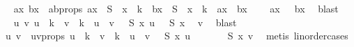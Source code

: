 \begin{isabellebody}
\ \isamarkupfalse%
\ ax\ bx\ \ ab{\isacharunderscore}{\kern0pt}props{\isacharcolon}{\kern0pt}\ {\isachardoublequoteopen}ax\ {\isasymin}\ S\ {\isacharbackquote}{\kern0pt}\ x\ {\isacharbackquote}{\kern0pt}\ {\isacharbraceleft}{\kern0pt}{\isachardot}{\kern0pt}{\isachardot}{\kern0pt}k{\isacharbraceright}{\kern0pt}\ {\isasymand}\ bx\ {\isasymin}\ S\ {\isacharbackquote}{\kern0pt}\ x\ {\isacharbackquote}{\kern0pt}\ {\isacharbraceleft}{\kern0pt}{\isachardot}{\kern0pt}{\isachardot}{\kern0pt}k{\isacharbraceright}{\kern0pt}\ {\isasymand}\ ax\ {\isasymnoteq}\ bx\ {\isasymand}\isanewline
\ \ {\isasymchi}\ ax\ {\isacharequal}{\kern0pt}\ {\isasymchi}\ bx{\isachardoublequoteclose}\ \isamarkupfalse%
\ blast\isanewline
\ \ \isamarkupfalse%
\ \isamarkupfalse%
\ {\isachardoublequoteopen}{\isasymexists}u\ v{\isachardot}{\kern0pt}\ u\ {\isasymin}\ {\isacharbraceleft}{\kern0pt}{\isachardot}{\kern0pt}{\isachardot}{\kern0pt}k{\isacharbraceright}{\kern0pt}\ {\isasymand}\ v\ {\isasymin}\ {\isacharbraceleft}{\kern0pt}{\isachardot}{\kern0pt}{\isachardot}{\kern0pt}k{\isacharbraceright}{\kern0pt}\ {\isasymand}\ u\ {\isasymnoteq}\ v\ {\isasymand}\ {\isasymchi}\ {\isacharparenleft}{\kern0pt}S\ {\isacharparenleft}{\kern0pt}x\ u{\isacharparenright}{\kern0pt}{\isacharparenright}{\kern0pt}\ {\isacharequal}{\kern0pt}\ {\isasymchi}\ {\isacharparenleft}{\kern0pt}S\ {\isacharparenleft}{\kern0pt}x\isanewline
\ \ v{\isacharparenright}{\kern0pt}{\isacharparenright}{\kern0pt}{\isachardoublequoteclose}\ \isamarkupfalse%
\ blast\isanewline
\ \ \isamarkupfalse%
\ \isamarkupfalse%
\ u\ v\ \ uv{\isacharunderscore}{\kern0pt}props{\isacharcolon}{\kern0pt}\ {\isachardoublequoteopen}u\ {\isasymin}\ {\isacharbraceleft}{\kern0pt}{\isachardot}{\kern0pt}{\isachardot}{\kern0pt}k{\isacharbraceright}{\kern0pt}\ {\isasymand}\ v\ {\isasymin}\ {\isacharbraceleft}{\kern0pt}{\isachardot}{\kern0pt}{\isachardot}{\kern0pt}k{\isacharbraceright}{\kern0pt}\ {\isasymand}\ u\ {\isacharless}{\kern0pt}\ v\ {\isasymand}\ {\isasymchi}\ {\isacharparenleft}{\kern0pt}S\ {\isacharparenleft}{\kern0pt}x\ u{\isacharparenright}{\kern0pt}{\isacharparenright}{\kern0pt}\ \isanewline
\ \ \ \ {\isacharequal}{\kern0pt}\ {\isasymchi}\ {\isacharparenleft}{\kern0pt}S\ {\isacharparenleft}{\kern0pt}x\ v{\isacharparenright}{\kern0pt}{\isacharparenright}{\kern0pt}{\isachardoublequoteclose}\ \isamarkupfalse%
\ {\isacharparenleft}{\kern0pt}metis\ linorder{\isacharunderscore}{\kern0pt}cases{\isacharparenright}{\kern0pt}\isanewline

\end{isabellebody}
